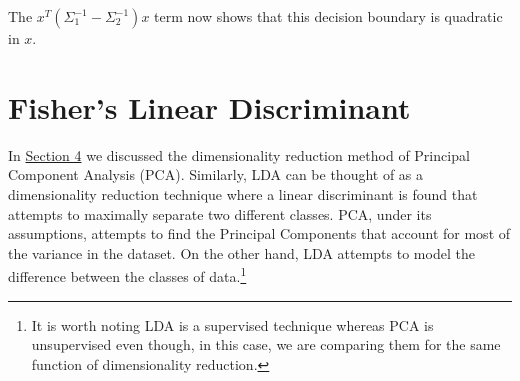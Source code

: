 \documentclass{article}
\begin{document}
The $x^T (\Sigma_1^{-1} - \Sigma_2^{-1}) x$ term now shows that this decision boundary is quadratic in $x$.

%
%



\section{Fisher's Linear Discriminant}

In \href{https://github.com/cs109/a-2017/blob/master/Sections/advanced/sec4.pdf}{Section 4} we discussed the dimensionality reduction method of Principal Component Analysis (PCA). Similarly, LDA can be thought of as a dimensionality reduction technique where a linear discriminant is found that attempts to maximally separate two different classes. PCA, under its assumptions, attempts to find the Principal Components that account for most of the variance in the dataset. On the other hand, LDA attempts to model the difference between the classes of data.\footnote{It is worth noting LDA is a supervised technique whereas PCA is unsupervised even though, in this case, we are comparing them for the same function of dimensionality reduction.}

\end{document}
